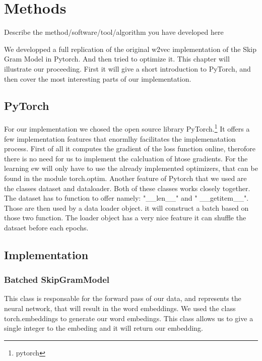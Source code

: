 \chapter{Methods}\label{chap:methods}
Describe the method/software/tool/algorithm you have developed here

We developped a  full replication of the original w2vec implementation of the Skip Gram Model in Pytorch. And then tried to optimize it. This chapter will illustrate our proceeding. First it will give a short introduction to PyTorch, and then cover the most interesting parts of our implementation. 
\section{PyTorch}
For our implementation we chosed the open source library PyTorch.\footnote{pytorch} It offers a few  implementation features that enormlhy facilitates the implemenatation process. First of all it computes the gradient of the loss function online, therofore there is no need for us to implement the calcluation of htose gradients. For the learning ew will only have to use the already implemented optimizers, that can be found in the module torch.optim. Another feature of Pytorch that we used are the classes dataset and dataloader. Both of these classes works closely together.   The dataset has to function to offer namely: "\_\_len\_\_" and " \_\_getitem\_\_". Those are then used by a data loader object. it will construct a batch based on those two function. The loader object has a very nice feature it can shuffle the datsaet before each epochs. 
\section{Implementation}
\subsection{Batched SkipGramModel}
This class is responsable for the forward pass of our data, and represents the neural network, that will result in the word embeddings. We used the class torch.embeddings to generate our word embedings. This class allows us to give a single integer to the embeding and it will return our embedding.  
